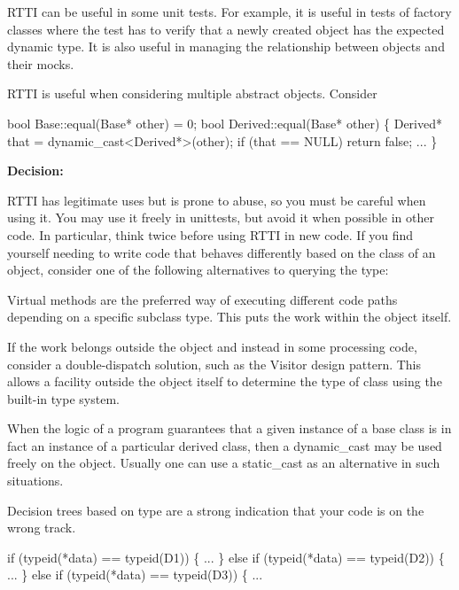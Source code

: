 R\+T\+TI can be useful in some unit tests. For example, it is useful in tests of factory classes where the test has to verify that a newly created object has the expected dynamic type. It is also useful in managing the relationship between objects and their mocks.

R\+T\+TI is useful when considering multiple abstract objects. Consider


\begin{DoxyCode}
\textcolor{keywordtype}{bool} Base::equal(Base* other) = 0;
\textcolor{keywordtype}{bool} Derived::equal(Base* other)
\{
    Derived* that = \textcolor{keyword}{dynamic\_cast<}Derived*\textcolor{keyword}{>}(other);
    \textcolor{keywordflow}{if} (that == NULL)
        \textcolor{keywordflow}{return} \textcolor{keyword}{false};
    ...
\}
\end{DoxyCode}


{\bfseries Decision\+:}

R\+T\+TI has legitimate uses but is prone to abuse, so you must be careful when using it. You may use it freely in unittests, but avoid it when possible in other code. In particular, think twice before using R\+T\+TI in new code. If you find yourself needing to write code that behaves differently based on the class of an object, consider one of the following alternatives to querying the type\+:


\begin{DoxyItemize}
\item Virtual methods are the preferred way of executing different code paths depending on a specific subclass type. This puts the work within the object itself.
\item If the work belongs outside the object and instead in some processing code, consider a double-\/dispatch solution, such as the Visitor design pattern. This allows a facility outside the object itself to determine the type of class using the built-\/in type system.
\end{DoxyItemize}

When the logic of a program guarantees that a given instance of a base class is in fact an instance of a particular derived class, then a {\ttfamily dynamic\+\_\+cast} may be used freely on the object. Usually one can use a {\ttfamily static\+\_\+cast} as an alternative in such situations.

Decision trees based on type are a strong indication that your code is on the wrong track.


\begin{DoxyCode}
\textcolor{keywordflow}{if} (\textcolor{keyword}{typeid}(*data) == \textcolor{keyword}{typeid}(D1)) \{
    ...
\} \textcolor{keywordflow}{else} \textcolor{keywordflow}{if} (\textcolor{keyword}{typeid}(*data) == \textcolor{keyword}{typeid}(D2)) \{
    ...
\} \textcolor{keywordflow}{else} \textcolor{keywordflow}{if} (\textcolor{keyword}{typeid}(*data) == \textcolor{keyword}{typeid}(D3)) \{
    ...
\end{DoxyCode}


